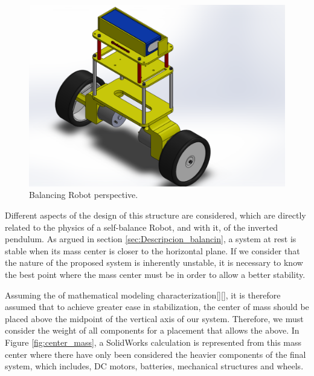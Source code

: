 \begin{center}
	\begin{figure}[H]
		\center
		\includegraphics[trim = 20mm 0mm 8cm 0mm,clip, angle=0, scale = 0.5]{imagenes/Balancing_Robot/EnsanBalanceCab.PDF}
		\caption{Balancing Robot perspective.}
		\label{fig:EnsanBalanceCab}
	\end{figure}
\end{center}

Different aspects of the design of this structure are considered, which are directly related to the physics of a self-balance Robot, and with it, of the inverted pendulum. \newline
As argued in section \ref{sec:Descripcion_balancin}, a system at rest is stable when its mass center is closer to the horizontal plane. If we consider that the nature of the proposed system is inherently unstable, it is necessary to know the best point where the mass center must be in order to allow a better stability. \newline

Assuming the of mathematical modeling characterization[][], it is therefore assumed that to achieve greater ease in stabilization, the center of mass should be placed above the midpoint of the vertical axis of our system. Therefore, we must consider the weight of all components for a placement that allows the above. \newline
In Figure \ref{fig:center_mass}, a SolidWorks calculation is represented from this mass center where there have only been considered the heavier components of the final system, which includes, DC motors, batteries, mechanical structures and wheels.

